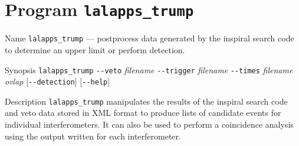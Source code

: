 \section{Program \texttt{lalapps\_trump}}
\label{program:lalapps-trump}

\begin{entry}

\item[Name]
\verb$lalapps_trump$ --- postprocess data generated by the inspiral
search code to determine an upper limit or perform detection. 

\item[Synopsis]
\verb$lalapps_trump$ \verb$--veto$ \textit{filename}
\verb$--trigger$ \textit{filename} \verb$--times$ \textit{filename}
\textit{ovlap} [\verb$--detection$] [\verb$--help$] 

\item[Description]
\verb$lalapps_trump$ manipulates the results of the inspiral search code
and veto data stored in XML format to produce lists of candidate
events for individual interferometers.   It can also be used to
perform a coincidence analysis using the output written for each
interferometer.  


\end{entry}
